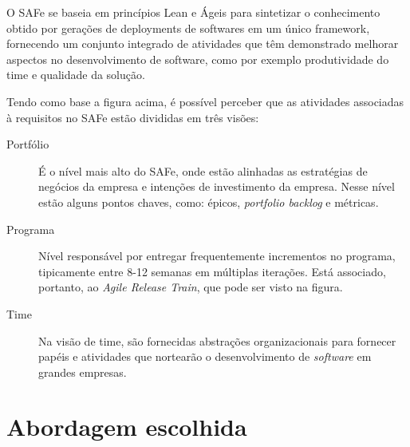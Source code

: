 O SAFe se baseia em princípios Lean e Ágeis para sintetizar o conhecimento obtido por gerações de deployments de softwares em um único framework, fornecendo um conjunto integrado de atividades que têm demonstrado melhorar aspectos no desenvolvimento de software, como por exemplo produtividade do time e qualidade da solução.

Tendo como base a figura acima, é possível perceber que as atividades associadas à requisitos no SAFe estão divididas em três visões:
\begin{description}
\item [Portfólio] É o nível mais alto do SAFe, onde estão alinhadas as estratégias de negócios da empresa e intenções de investimento da empresa. Nesse nível estão alguns pontos chaves, como: épicos, \textit{portfolio backlog} e métricas.
\item [Programa] Nível responsável por entregar frequentemente incrementos no programa, tipicamente entre 8-12 semanas em múltiplas iterações. Está associado, portanto, ao \textit{Agile Release Train}, que pode ser visto na figura.
\item [Time] Na visão de time, são fornecidas abstrações organizacionais para fornecer papéis e atividades que nortearão o desenvolvimento de \textit{software} em grandes empresas. 
\end{description}

\section{Abordagem escolhida}

